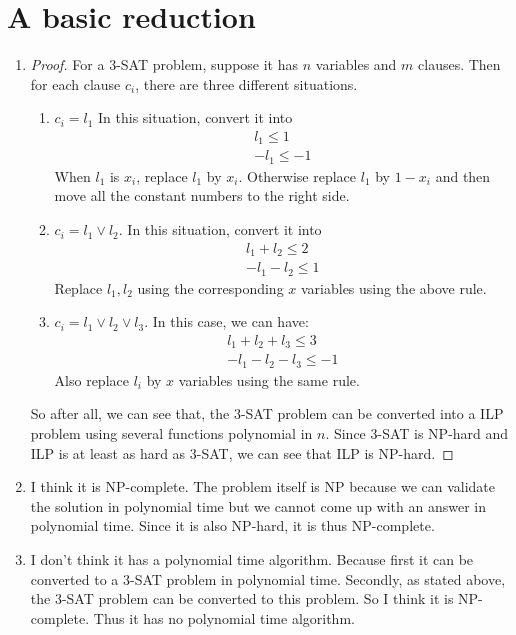 \documentclass{article}
\begin{document}
	\section{A basic reduction}
		\begin{enumerate}
			\item \begin{proof}
				For a 3-SAT problem, suppose it has $n$ variables and $m$ clauses. Then for each clause $c_i$, there are three different situations.\begin{enumerate}
				\item $c_i = l_1$ In this situation, convert it into \begin{gather}
					l_1 \leq 1 \\
					-l_1 \leq -1
				\end{gather}
				When $l_1$ is $x_i$, replace $l_1$ by $x_i$. Otherwise replace $l_1$ by $1 - x_i$ and then move all the constant numbers to the right side.
				\item $c_i = l_1 \vee l_2$. In this situation, convert it into \begin{gather}
					l_1 + l_2 \leq 2 \\
					-l_1 - l_2 \leq 1
				\end{gather}
				Replace $l_1,l_2$ using the corresponding $x$ variables using the above rule.
				\item $c_i = l_1 \vee l_2 \vee l_3$. In this case, we can have:
				\begin{gather}
					l_1 + l_2 + l_3 \leq 3 \\
					-l_1 - l_2 - l_3 \leq -1
				\end{gather}
				Also replace $l_i$ by $x$ variables using the same rule. \newline
				\end{enumerate}
				So after all, we can see that, the 3-SAT problem can be converted into a ILP problem using several functions polynomial in $n$. Since 3-SAT is NP-hard and ILP is at least as hard as 3-SAT, we can see that ILP is NP-hard.
				\end{proof}
			\item I think it is NP-complete. The problem itself is NP because we can validate the solution in polynomial time but we cannot come up with an answer in polynomial time. Since it is also NP-hard, it is thus NP-complete.
			\item I don't think it has a polynomial time algorithm. Because first it can be converted to a 3-SAT problem in polynomial time. Secondly, as stated above, the 3-SAT problem can be converted to this problem. So I think it is NP-complete. Thus it has no polynomial time algorithm.
		\end{enumerate}
\end{document}
